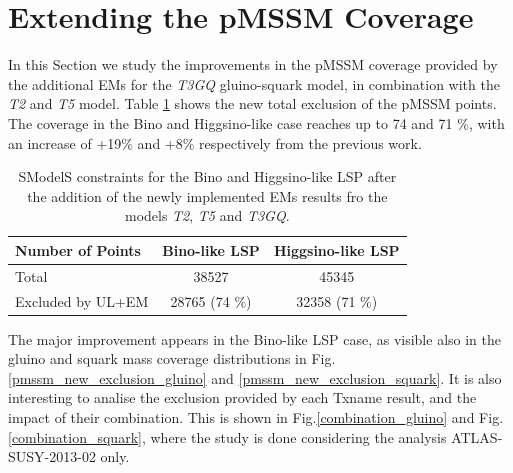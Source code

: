 \documentclass[a4paper,11pt]{article}
\begin{document}
\section{Extending the pMSSM Coverage}\label{sec::impact}
In this Section we study the improvements in the pMSSM coverage provided by the additional EMs for the \textit{T3GQ} gluino-squark model, in combination with the \textit{T2} and \textit{T5} model. Table \ref{Res_Tab_New} shows the new total exclusion of the pMSSM points. The coverage in the Bino and Higgsino-like case reaches up to 74 and 71 $\%$, with an increase of +19$\%$ and +8$\%$ respectively from the previous work. 
%
\begin{table}
\center
\renewcommand{\arraystretch}{1.3}
\begin{tabular}{ l | c   c  }
\textbf{Number of Points} & \textbf{Bino-like LSP }& \textbf{Higgsino-like LSP} \\
\toprule \toprule
Total   & 38527 & 45345 \\
Excluded by UL+EM & 28765 (74 $\%$) & 32358 (71 $\%$) \\ 
\hline
\end{tabular}
\caption{SModelS constraints for the Bino and Higgsino-like LSP after the addition of the newly implemented EMs results fro the models \textit{T2}, \textit{T5} and \textit{T3GQ}.}
\label{Res_Tab_New}
\end{table}
%
The major improvement appears in the Bino-like LSP case, as visible also in the gluino and squark mass coverage distributions in Fig. \ref{pmssm_new_exclusion_gluino} and \ref{pmssm_new_exclusion_squark}. 
%
It is also interesting to analise the exclusion provided by each Txname result, and the impact of their combination. This is shown in Fig.\ref{combination_gluino} and Fig.\ref{combination_squark}, where the study is done considering the analysis ATLAS-SUSY-2013-02 only. 
%
\end{document}

